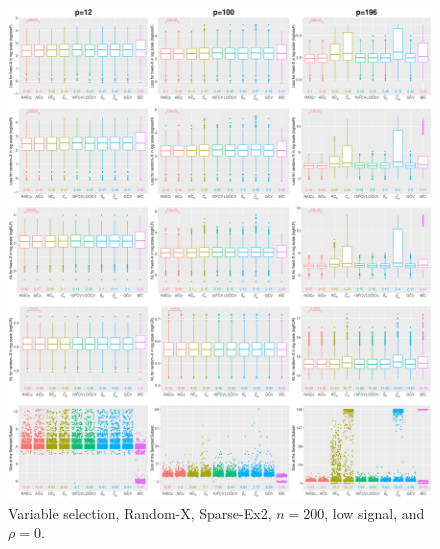 \begin{figure}[!ht]
\centering
\includegraphics[width=\textwidth]{figures/supplement/randomx/subset_selection/Sparse-Ex2_n200_lsnr_rho0.eps}
\caption{Variable selection, Random-X, Sparse-Ex2, $n=200$, low signal, and $\rho=0$.}
\end{figure}
\clearpage
